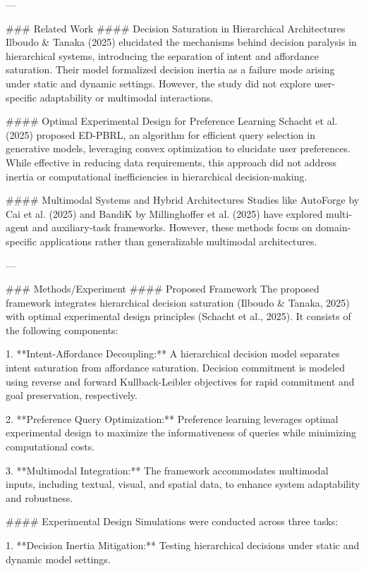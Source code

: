 ---

### Related Work  
#### Decision Saturation in Hierarchical Architectures  
Ilboudo & Tanaka (2025) elucidated the mechanisms behind decision paralysis in hierarchical systems, introducing the separation of intent and affordance saturation. Their model formalized decision inertia as a failure mode arising under static and dynamic settings. However, the study did not explore user-specific adaptability or multimodal interactions.

#### Optimal Experimental Design for Preference Learning  
Schacht et al. (2025) proposed ED-PBRL, an algorithm for efficient query selection in generative models, leveraging convex optimization to elucidate user preferences. While effective in reducing data requirements, this approach did not address inertia or computational inefficiencies in hierarchical decision-making.

#### Multimodal Systems and Hybrid Architectures  
Studies like AutoForge by Cai et al. (2025) and BandiK by Millinghoffer et al. (2025) have explored multi-agent and auxiliary-task frameworks. However, these methods focus on domain-specific applications rather than generalizable multimodal architectures.

---

### Methods/Experiment  
#### Proposed Framework  
The proposed framework integrates hierarchical decision saturation (Ilboudo & Tanaka, 2025) with optimal experimental design principles (Schacht et al., 2025). It consists of the following components:

1. **Intent-Affordance Decoupling:**  
   A hierarchical decision model separates intent saturation from affordance saturation. Decision commitment is modeled using reverse and forward Kullback-Leibler objectives for rapid commitment and goal preservation, respectively.

2. **Preference Query Optimization:**  
   Preference learning leverages optimal experimental design to maximize the informativeness of queries while minimizing computational costs.

3. **Multimodal Integration:**  
   The framework accommodates multimodal inputs, including textual, visual, and spatial data, to enhance system adaptability and robustness.

#### Experimental Design  
Simulations were conducted across three tasks:

1. **Decision Inertia Mitigation:**  
   Testing hierarchical decisions under static and dynamic model settings.

